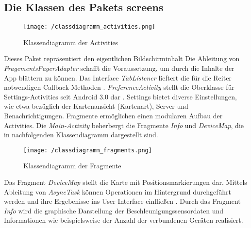\subsection{Die Klassen des Pakets screens}
\begin{figure}[H]
\centering
\texttt{[image: /classdiagramm\_activities.png]}
\caption{Klassendiagramm der Activities}
\label{fig:classdiagramm_activities}
\end{figure}
Dieses Paket repräsentiert den eigentlichen Bildschirminhalt Die Ableitung von
\emph{FragementsPagerAdapter} schafft die Voraussetzung, um durch die Inhalte der App
blättern zu können. Das Interface \emph{TabListener} lieftert die für die Reiter
notwendigen Callback-Methoden . \emph{PreferenceActivity} stellt die Oberklasse für
Settings-Activities seit Android 3.0 dar \cite[vgl.][]{ADevPrefActivity}. Settings bietet diverse
Einstellungen, wie etwa bezüglich der Kartenansicht (Kartenart), Server und Benachrichtigungen. Fragmente ermöglichen einen
modularen Aufbau der Activities. Die \emph{Main-Activity} beherbergt die Fragmente \emph{Info}
und \emph{DeviceMap}, die in nachfolgenden Klassendiagramm dargestellt sind.


\begin{figure}[H]
\centering
\texttt{[image: /classdiagramm\_fragments.png]}
\caption{Klassendiagramm der Fragmente}
\label{fig:classdiagramm_fragments}
\end{figure}
Das Fragment \emph{DeviceMap} stellt die Karte mit Positionsmarkierungen dar.  
Mittels Ableitung von \emph{AsyncTask} können Operationen im Hintergrund durchgeführt werden und
ihre Ergebenisse ins {User Interface} einfließen \cite[vgl.][]{ADevAsyncTask}. Durch das Fragment
\emph{Info} wird die graphische Darstellung der Beschleunigungssensordaten und Informationen wie beispielsweise der Anzahl der
verbundenen Geräten realisiert.





